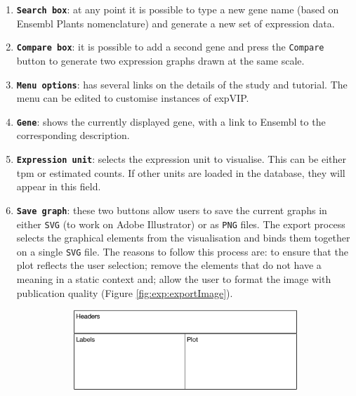 \begin{enumerate}
\item
  \textbf{\lstinline!Search box!}: at any point it is possible to type a new gene name (based on Ensembl Plants nomenclature) and generate a new set of expression data.
\item
  \textbf{\lstinline!Compare box!}: it is possible to add a second gene and press the \lstinline!Compare! button to generate two expression graphs drawn at the same scale.
\item
  \textbf{\lstinline!Menu options!}: has several links on the details of the study and tutorial. The menu can be edited to customise instances of expVIP. 
\item
  \textbf{\lstinline!Gene!}: shows the currently displayed gene, with a link to Ensembl to the corresponding description. 
\item
  \textbf{\lstinline!Expression unit!}: selects the expression unit to visualise. This can be either \gls{tpm} or  estimated counts. If other units are loaded in the database, they will appear in this field. 
\item
  \textbf{\lstinline!Save graph!}: these two buttons allow users to save the current graphs in either \lstinline!SVG! (to work on Adobe Illustrator) or as \lstinline!PNG! files. 
  The export process selects the graphical elements from the visualisation and binds them together on a single \verb|SVG| file. The reasons to follow this process are: to ensure that the plot reflects the user selection; remove the elements that do not have a meaning in a static context and; allow the user to format the image with publication quality (Figure \ref{fig:exp:exportImage}).

\begin{figure}
\centering
\begin{subfigure}{0.8\textwidth}
\caption{}
\label{fig:exp:exportLayout}
\includegraphics[width=1\textwidth]{expVIP/Figures/Exportsketch.pdf}
\end{subfigure}


\end{figure}
\end{enumerate}
